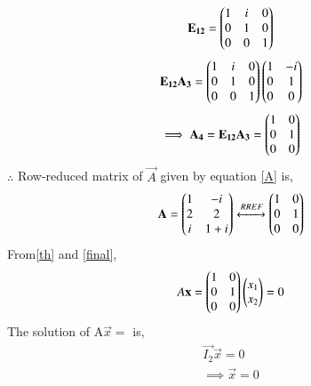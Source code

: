 \documentclass[journal,12pt,twocolumn]{IEEEtran}
\begin{document}
\begin{align}
\mathbf{E_{12}} = \begin{pmatrix}1&i&0\\0&1&0\\0&0&1\end{pmatrix}
\end{align}
\begin{align}
\mathbf{E_{12}A_3} =\begin{pmatrix}1&i&0\\0&1&0\\0&0&1\end{pmatrix} \begin{pmatrix}1&-i\\0&1\\0&0\end{pmatrix}
\end{align}
\begin{align}
\implies \mathbf{A_4} = \mathbf{E_{12}A_3} = \begin{pmatrix}1&0\\0&1\\0&0\end{pmatrix}\label{5}
\end{align}
$\therefore$ Row-reduced matrix of $\vec{A}$ given by equation \eqref{A} is,
\begin{align}
\mathbf{A} =  \begin{pmatrix}1&-i\\2&2\\i&1+i\end{pmatrix}\xleftrightarrow[]{RREF}\begin{pmatrix}1&0\\0&1\\0&0\end{pmatrix}\label{final}
\end{align}
From\eqref{th} and \eqref{final},
\begin{align}
A\mathbf{x} = \begin{pmatrix}1&0\\0&1\\0&0\end{pmatrix}\begin{pmatrix}x_1\\x_2\end{pmatrix} = 0
\end{align}
The solution of  A$\vec{x}=$ is,
\begin{align}
\vec{I_2} \vec{x} = 0\\
\implies \vec{x} = 0
\end{align}
\end{document}
